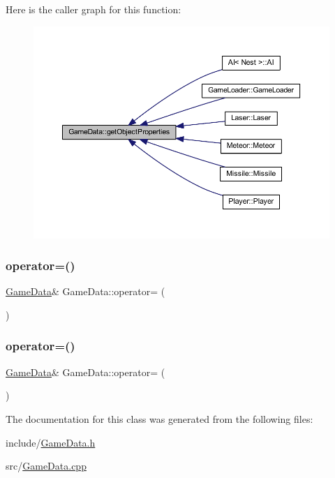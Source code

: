 Here is the caller graph for this function\+:
\nopagebreak
\begin{figure}[H]
\begin{center}
\leavevmode
\includegraphics[width=350pt]{class_game_data_acf4e9f7e0bbd359c54d048ccdbbdcd2b_icgraph}
\end{center}
\end{figure}
\mbox{\label{class_game_data_af68a0e80d4eaf087f85c41731aec3713}} 
\subsubsection{\texorpdfstring{operator=()}{operator=()}\hspace{0.1cm}{\footnotesize\ttfamily [1/2]}}
{\footnotesize\ttfamily \hyperlink{class_game_data}{Game\+Data}\& Game\+Data\+::operator= (\begin{DoxyParamCaption}\item[{\hyperlink{class_game_data}{Game\+Data} const \&}]{ }\end{DoxyParamCaption})\hspace{0.3cm}{\ttfamily [delete]}}

\mbox{\label{class_game_data_a7727619253e644dde96794e47ff9ff27}} 
\subsubsection{\texorpdfstring{operator=()}{operator=()}\hspace{0.1cm}{\footnotesize\ttfamily [2/2]}}
{\footnotesize\ttfamily \hyperlink{class_game_data}{Game\+Data}\& Game\+Data\+::operator= (\begin{DoxyParamCaption}\item[{\hyperlink{class_game_data}{Game\+Data} \&\&}]{ }\end{DoxyParamCaption})\hspace{0.3cm}{\ttfamily [delete]}}



The documentation for this class was generated from the following files\+:\begin{DoxyCompactItemize}
\item 
include/\hyperlink{_game_data_8h}{Game\+Data.\+h}\item 
src/\hyperlink{_game_data_8cpp}{Game\+Data.\+cpp}\end{DoxyCompactItemize}
